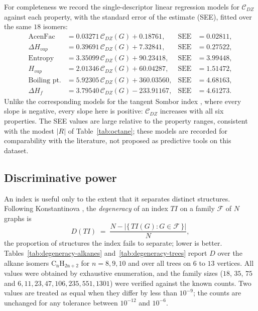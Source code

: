 \documentclass[11pt,a4paper]{article}
\theoremstyle{plain}
\theoremstyle{definition}
\theoremstyle{remark}
\newcommand{\CDZ}{\mathcal{C}_{DZ}}
\begin{document}
For completeness we record the single-descriptor linear regression models for
$\CDZ$ against each property, with the standard error of the estimate (SEE),
fitted over the same $18$ isomers:
\begin{align*}
\text{AcenFac} &= 0.03271\,\CDZ(G) + 0.18761, & \text{SEE} &= 0.02811,\\
\Delta H_{vap} &= 0.39691\,\CDZ(G) + 7.32841, & \text{SEE} &= 0.27522,\\
\text{Entropy} &= 3.35099\,\CDZ(G) + 90.23418, & \text{SEE} &= 3.99448,\\
H_{vap} &= 2.01346\,\CDZ(G) + 60.04287, & \text{SEE} &= 1.51472,\\
\text{Boiling pt.} &= 5.92305\,\CDZ(G) + 360.03560, & \text{SEE} &= 4.68163,\\
\Delta H_f &= 3.79540\,\CDZ(G) - 233.91167, & \text{SEE} &= 4.61273.
\end{align*}
Unlike the corresponding models for the tangent Sombor index \cite{oz2025},
where every slope is negative, every slope here is positive: $\CDZ$ increases
with all six properties. The SEE values are large relative to the property
ranges, consistent with the modest $|R|$ of Table~\ref{tab:octane}; these models
are recorded for comparability with the literature, not proposed as predictive
tools on this dataset.

\subsection{Discriminative power}
\label{sec:degeneracy}

An index is useful only to the extent that it separates distinct structures.
Following Konstantinova \cite{konstantinova1996}, the \emph{degeneracy} of an
index $TI$ on a family $\mathcal F$ of $N$ graphs is
\[
  D(TI)\;=\;\frac{N-\bigl|\{\,TI(G):G\in\mathcal F\,\}\bigr|}{N},
\]
the proportion of structures the index fails to separate; lower is better.
Tables~\ref{tab:degeneracy-alkanes} and~\ref{tab:degeneracy-trees} report $D$
over the alkane isomers $\mathrm{C_nH_{2n+2}}$ for $n=8,9,10$ and over all trees
on $6$ to $13$ vertices. All values were obtained by exhaustive enumeration, and
the family sizes ($18$, $35$, $75$ and $6,11,23,47,106,235,551,1301$) were
verified against the known counts. Two values are treated as equal when they
differ by less than $10^{-9}$; the counts are unchanged for any tolerance
between $10^{-12}$ and $10^{-6}$.
\end{document}
